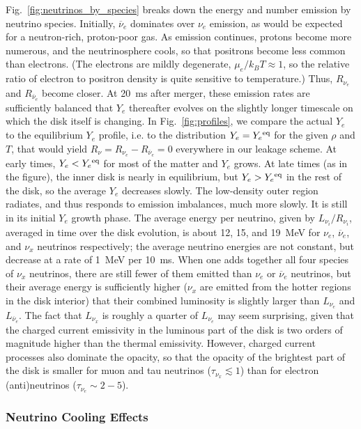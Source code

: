Fig.~\ref{fig:neutrinos_by_species} breaks down the energy and number
emission by neutrino species.  Initially, $\overline{\nu}_e$
dominates over $\nu_e$ emission, as would be expected for a neutron-rich,
proton-poor gas.  As emission continues, protons become more numerous, and
the neutrinosphere cools, so that positrons become less common than electrons. 
(The electrons are mildly degenerate, $\mu_e/k_BT\approx 1$, so the relative
ratio of electron to positron density is quite sensitive to temperature.)
Thus, $R_{\nu_e}$ and $R_{\overline{\nu}_e}$ become closer.  At 20~ms after merger,
these emission rates are sufficiently balanced that $Y_e$ thereafter
evolves on the slightly longer timescale on
which the disk itself is changing.  In Fig.~\ref{fig:profiles}, we 
compare the actual $Y_e$ to the equilibrium $Y_e$ profile, i.e. to the
distribution $Y_e=Y_e{}^{\rm eq}$ for the given $\rho$ and $T$, that would yield
$R_{\nu}=R_{\nu_e}-R_{\overline{\nu}_e}=0$ everywhere in our leakage scheme. 
At early times,
$Y_e < Y_e{}^{\rm eq}$ for most of the matter and $Y_e$ grows.  At late times
(as in the figure), the inner disk is nearly in equilibrium, but
$Y_e > Y_e{}^{\rm eq}$ in the rest of the disk, so the average $Y_e$ decreases
slowly.  The low-density outer region radiates, and thus responds to emission
imbalances, much more slowly.  It is still in its initial $Y_e$ growth phase.
The average energy per neutrino, given by $L_{\nu_i}/R_{\nu_i}$, averaged in
time over the disk evolution, is about 12, 15, and 19~MeV for
$\nu_e$, $\overline{\nu}_e$, and $\nu_x$ neutrinos respectively;
the average neutrino energies are not constant, but decrease at a rate of 1~MeV per 10~ms.
When one adds together all four species of $\nu_x$ neutrinos, there are still fewer
of them emitted than $\nu_e$ or $\overline{\nu}_e$ neutrinos, but their
average energy is sufficiently higher ($\nu_x$ are emitted from the hotter regions
in the disk interior) that their combined luminosity is slightly larger than
$L_{\nu_e}$ and $L_{\overline{\nu}_e}$. The fact that $L_{\nu_x}$ is roughly a
quarter of $L_{\nu_e}$ may seem surprising, given that the charged current emissivity
in the luminous part of the disk is two orders of magnitude higher than the thermal
emissivity.  However, charged current processes also dominate the opacity, so that the
opacity of the brightest part of the disk is smaller for muon and tau neutrinos
($\tau_{\nu_x}\lesssim 1$) than for electron (anti)neutrinos ($\tau_{\nu_e}\sim 2-5$).

\subsubsection{Neutrino Cooling Effects}

